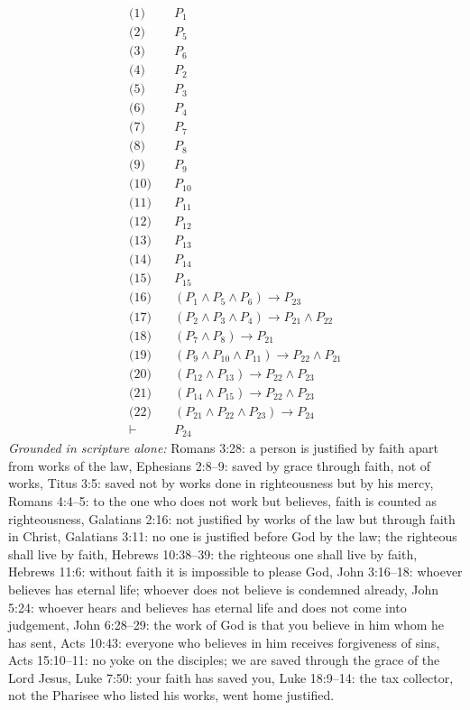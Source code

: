 \documentclass[11pt]{article}
\begin{document}
\begin{align*}
  \text{(1)} \quad & P_{1} \\
  \text{(2)} \quad & P_{5} \\
  \text{(3)} \quad & P_{6} \\
  \text{(4)} \quad & P_{2} \\
  \text{(5)} \quad & P_{3} \\
  \text{(6)} \quad & P_{4} \\
  \text{(7)} \quad & P_{7} \\
  \text{(8)} \quad & P_{8} \\
  \text{(9)} \quad & P_{9} \\
  \text{(10)} \quad & P_{10} \\
  \text{(11)} \quad & P_{11} \\
  \text{(12)} \quad & P_{12} \\
  \text{(13)} \quad & P_{13} \\
  \text{(14)} \quad & P_{14} \\
  \text{(15)} \quad & P_{15} \\
  \text{(16)} \quad & (P_{1} \land P_{5} \land P_{6}) \rightarrow P_{23} \\
  \text{(17)} \quad & (P_{2} \land P_{3} \land P_{4}) \rightarrow P_{21} \land P_{22} \\
  \text{(18)} \quad & (P_{7} \land P_{8}) \rightarrow P_{21} \\
  \text{(19)} \quad & (P_{9} \land P_{10} \land P_{11}) \rightarrow P_{22} \land P_{21} \\
  \text{(20)} \quad & (P_{12} \land P_{13}) \rightarrow P_{22} \land P_{23} \\
  \text{(21)} \quad & (P_{14} \land P_{15}) \rightarrow P_{22} \land P_{23} \\
  \text{(22)} \quad & (P_{21} \land P_{22} \land P_{23}) \rightarrow P_{24} \\
  \vdash \quad & P_{24}
\end{align*}
\emph{Grounded in scripture alone:} Romans 3:28: a person is justified by faith apart from works of the law, Ephesians 2:8–9: saved by grace through faith, not of works, Titus 3:5: saved not by works done in righteousness but by his mercy, Romans 4:4–5: to the one who does not work but believes, faith is counted as righteousness, Galatians 2:16: not justified by works of the law but through faith in Christ, Galatians 3:11: no one is justified before God by the law; the righteous shall live by faith, Hebrews 10:38–39: the righteous one shall live by faith, Hebrews 11:6: without faith it is impossible to please God, John 3:16–18: whoever believes has eternal life; whoever does not believe is condemned already, John 5:24: whoever hears and believes has eternal life and does not come into judgement, John 6:28–29: the work of God is that you believe in him whom he has sent, Acts 10:43: everyone who believes in him receives forgiveness of sins, Acts 15:10–11: no yoke on the disciples; we are saved through the grace of the Lord Jesus, Luke 7:50: your faith has saved you, Luke 18:9–14: the tax collector, not the Pharisee who listed his works, went home justified.
\end{document}
